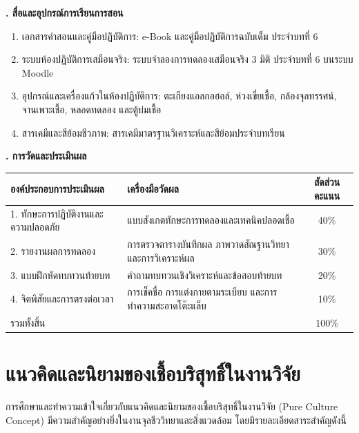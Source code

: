 \noindent\textbf{. สื่อและอุปกรณ์การเรียนการสอน}

\begin{enumerate}
    \item เอกสารคำสอนและคู่มือปฏิบัติการ: e-Book และคู่มือปฏิบัติการฉบับเต็ม ประจำบทที่ 6
    \item ระบบห้องปฏิบัติการเสมือนจริง: ระบบจำลองการทดลองเสมือนจริง 3 มิติ ประจำบทที่ 6 บนระบบ Moodle
    \item อุปกรณ์และเครื่องแก้วในห้องปฏิบัติการ: ตะเกียงแอลกอฮอล์, ห่วงเขี่ยเชื้อ, กล้องจุลทรรศน์, จานเพาะเชื้อ, หลอดทดลอง และตู้บ่มเชื้อ
    \item สารเคมีและสีย้อมชีวภาพ: สารเคมีมาตรฐานวิเคราะห์และสีย้อมประจำบทเรียน
\end{enumerate}

\noindent\textbf{. การวัดและประเมินผล}

\begin{table}[H]
\centering\small
\begin{tabularx}{\textwidth}{p{} p{} c}
\toprule
\textbf{องค์ประกอบการประเมินผล} & \textbf{เครื่องมือวัดผล} & \textbf{สัดส่วนคะแนน} \\
\midrule
1. ทักษะการปฏิบัติงานและความปลอดภัย & แบบสังเกตทักษะการทดลองและเทคนิคปลอดเชื้อ & 40\% \\
2. รายงานผลการทดลอง & การตรวจตารางบันทึกผล ภาพวาดสัณฐานวิทยา และการวิเคราะห์ผล & 30\% \\
3. แบบฝึกหัดทบทวนท้ายบท & คำถามทบทวนเชิงวิเคราะห์และข้อสอบท้ายบท & 20\% \\
4. จิตพิสัยและการตรงต่อเวลา & การเช็คชื่อ การแต่งกายตามระเบียบ และการทำความสะอาดโต๊ะแล็บ & 10\% \\
รวมทั้งสิ้น &  & 100\% \\
\bottomrule
\end{tabularx}
\end{table}

\newpage


\section{แนวคิดและนิยามของเชื้อบริสุทธิ์ในงานวิจัย}

การศึกษาและทำความเข้าใจเกี่ยวกับแนวคิดและนิยามของเชื้อบริสุทธิ์ในงานวิจัย (Pure Culture Concept) มีความสำคัญอย่างยิ่งในงานจุลชีววิทยาและสิ่งแวดล้อม โดยมีรายละเอียดสาระสำคัญดังนี้

